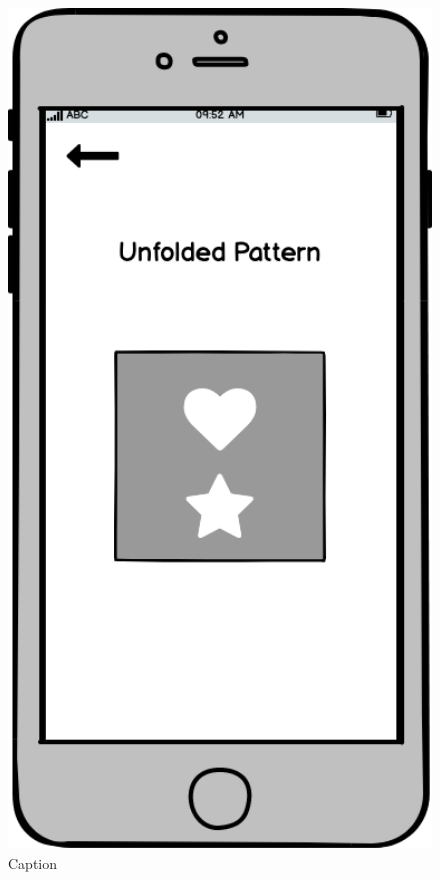 \documentclass[11pt]{article}
\begin{document}
            \begin{figure}
                \begin{minipage}[c]{0.65\textwidth}
                \caption{Caption}
                \label{fig:reveal}
                \end{minipage}\hfill
                \begin{minipage}[c]{0.35\textwidth}
                \includegraphics[width=1\textwidth]{Images/Prototype/prototypeReveal.png}
                \end{minipage}
            \end{figure}
            
\end{document}
